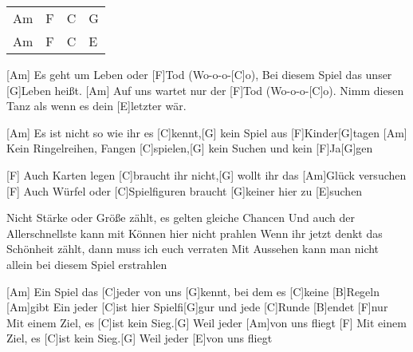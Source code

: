

\begin{guitar}
	{\footnotesize\begin{tabular}{|l|l|l|l|}
			Am & F & C & G \\
			Am & F & C & E
	\end{tabular}}
	
	\begin{highlightbar}
		[Am] Es geht um Leben oder [F]Tod (Wo-o-o-[C]o),
		Bei diesem Spiel das unser [G]Leben heißt.
		[Am] Auf uns wartet nur der [F]Tod (Wo-o-o-[C]o).
		Nimm diesen Tanz als wenn es dein [E]letzter wär.
	\end{highlightbar}
	
	\songsection{Strophe 1}
	[Am] Es ist nicht so wie ihr es [C]kennt,[G] kein Spiel aus [F]Kinder[G]tagen
	[Am] Kein Ringelreihen, Fangen [C]spielen,[G] kein Suchen und kein [F]Ja[G]gen
	
	[F] Auch Karten legen [C]braucht ihr nicht,[G] wollt ihr das [Am]Glück versuchen
	[F] Auch Würfel oder [C]Spielfiguren braucht [G]keiner hier zu [E]suchen
	
	\begin{highlightbar}
		  \optionalChord{(x2)}
	\end{highlightbar}
	
	\songsection{Strophe 2}
	Nicht Stärke oder Größe zählt, es gelten gleiche Chancen
	Und auch der Allerschnellste kann mit Können hier nicht prahlen
	Wenn ihr jetzt denkt das Schönheit zählt, dann muss ich euch verraten
	Mit Aussehen kann man nicht allein bei diesem Spiel erstrahlen
	
	\begin{highlightbar}
		  
	\end{highlightbar}
	
	\songsection{Bridge}
	[Am] Ein Spiel das [C]jeder von uns [G]kennt, bei dem es [C]keine [B]Regeln [Am]gibt
	Ein jeder [C]ist hier Spielfi[G]gur und jede [C]Runde [B]endet [F]nur
	Mit einem Ziel, es [C]ist kein Sieg.[G] Weil jeder [Am]von uns fliegt
	[F] Mit einem Ziel, es [C]ist kein Sieg.[G] Weil jeder [E]von uns fliegt
	
	\begin{highlightbar}
		  \optionalChord{(x2)}
	\end{highlightbar}
\end{guitar}
